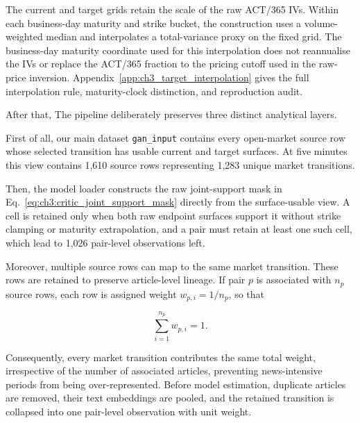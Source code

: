 The current and target grids retain the scale of the raw ACT/365 IVs. Within each business-day maturity and strike bucket, the construction uses a volume-weighted median and interpolates a total-variance proxy on the fixed grid. The business-day maturity coordinate used for this interpolation does not reannualise the IVs or replace the ACT/365 fraction to the pricing cutoff used in the raw-price inversion. Appendix~\ref{app:ch3_target_interpolation} gives the full interpolation rule, maturity-clock distinction, and reproduction audit.


After that, The pipeline deliberately preserves three distinct analytical layers. 

First of all, our main dataset \texttt{gan\_input}  contains every open-market source row whose selected transition has usable current and target surfaces. At five minutes this view contains 1,610 source rows representing 1,283 unique market transitions.




Then, the model loader constructs the raw joint-support mask in Eq.~\eqref{eq:ch3:critic_joint_support_mask} directly from the surface-usable view. A cell is retained only when both raw endpoint surfaces support it without strike clamping or maturity extrapolation, and a pair must retain at least one such cell, which lead to 1,026 pair-level observations left. 




Moreover, multiple source rows can map to the same market transition. These rows are retained to preserve article-level lineage. If pair \(p\) is associated with \(n_p\) source rows, each row is assigned weight \(w_{p,i}=1/n_p\), so that

\begin{equation}
\sum_{i=1}^{n_p} w_{p,i}=1.
\end{equation}

Consequently, every market transition contributes the same total weight, irrespective of the number of associated articles, preventing news-intensive periods from being over-represented. Before model estimation, duplicate
articles are removed, their text embeddings are pooled, and the retained transition is collapsed into one pair-level observation with unit weight.

